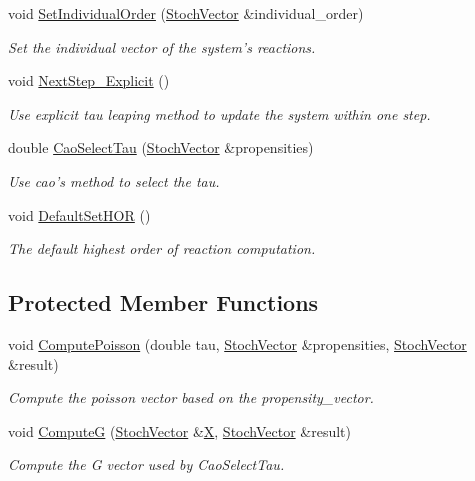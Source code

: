 \begin{CompactItemize}
void \hyperlink{class_tau_leaping_b5328d24346442c748a96158976a2c7f}{SetIndividualOrder} (\hyperlink{class_stoch_vector}{StochVector} \&individual\_\-order)
\begin{CompactList}\small\item\em Set the individual vector of the system's reactions. \item\end{CompactList}\item 
void \hyperlink{class_tau_leaping_1f930cd36e11f38a0e134850682a78e5}{NextStep\_\-Explicit} ()
\begin{CompactList}\small\item\em Use explicit tau leaping method to update the system within one step. \item\end{CompactList}\item 
double \hyperlink{class_tau_leaping_8ca21d486f8bee4ac74b35814046742b}{CaoSelectTau} (\hyperlink{class_stoch_vector}{StochVector} \&propensities)
\begin{CompactList}\small\item\em Use cao's method to select the tau. \item\end{CompactList}\item 
void \hyperlink{class_tau_leaping_bf3fe61f601dba394a2e99c280d688a6}{DefaultSetHOR} ()
\begin{CompactList}\small\item\em The default highest order of reaction computation. \item\end{CompactList}\end{CompactItemize}
\subsection*{Protected Member Functions}
\begin{CompactItemize}
\item 
void \hyperlink{class_tau_leaping_df74b4a52d8758ae59635bd3b9463bff}{ComputePoisson} (double tau, \hyperlink{class_stoch_vector}{StochVector} \&propensities, \hyperlink{class_stoch_vector}{StochVector} \&result)
\begin{CompactList}\small\item\em Compute the poisson vector based on the propensity\_\-vector. \item\end{CompactList}\item 
\hypertarget{class_tau_leaping_8837e2d34357a60779653c04735e97b4}{
void \hyperlink{class_tau_leaping_8837e2d34357a60779653c04735e97b4}{ComputeG} (\hyperlink{class_stoch_vector}{StochVector} \&\hyperlink{class_base_system_1727d447a5fb8c717c72af8eb9ebe2c3}{X}, \hyperlink{class_stoch_vector}{StochVector} \&result)}
\label{class_tau_leaping_8837e2d34357a60779653c04735e97b4}

\begin{CompactList}\small\item\em Compute the G vector used by CaoSelectTau. \item\end{CompactList}\end{CompactItemize}
